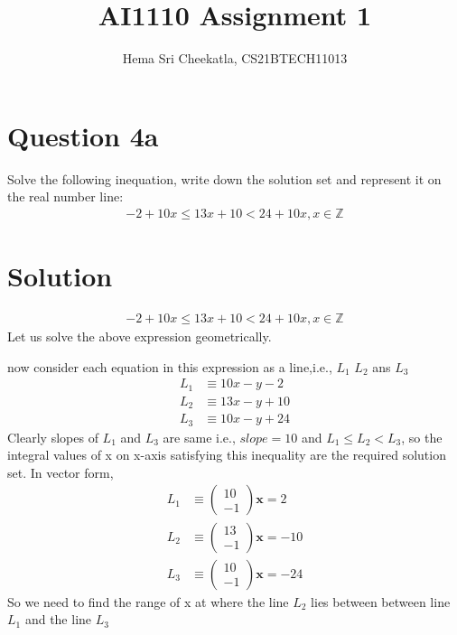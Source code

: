\documentclass[16pt, a4paper, two column]{article}
\title{AI1110 Assignment 1}
\author{Hema Sri Cheekatla, CS21BTECH11013}
\newcommand{\myvec}[1]{\ensuremath{\begin{pmatrix}#1\end{pmatrix}}}
\let\vec\mathbf
\begin{document}
\maketitle
\section*{Question 4a}
Solve the following inequation, write down the solution set and represent it on the real number line:
\begin{align*}
  -2 + 10x \leq 13x + 10 < 24 + 10x,  x\in \mathbb{Z} 
\end{align*}
\section*{Solution}
\begin{align}
  -2 + 10x \leq 13x + 10 < 24 + 10x,  x\in \mathbb{Z} 
\end{align}
\noindent Let us solve the above expression geometrically.

now consider each equation in this expression as a line,i.e., $L_1$ $L_2$ ans $L_3$
\begin{align}
L_1 &\equiv 10x-y-2  \\
L_2 &\equiv 13x-y+10 \\
L_3 &\equiv 10x-y+24
\end{align}
Clearly slopes of $L_1$ and $L_3$ are same i.e., $slope = 10$\newline
and $L_1 \leq L_2 < L_3 $, so the integral values of x on x-axis satisfying this inequality are the required solution set.
In vector form,
\begin{align}
	L_1 &\equiv \myvec{10 \\ -1}\vec{x} = 2 \\
	L_2 &\equiv \myvec{13 \\ -1} \vec{x} = -10 \\
	L_3 &\equiv \myvec{10 \\ -1}\vec{x} = -24
\end{align}
So we need to find the range of x at where the line $L_2$ lies between between line $L_1$ and the line $L_3$
\end{document}
